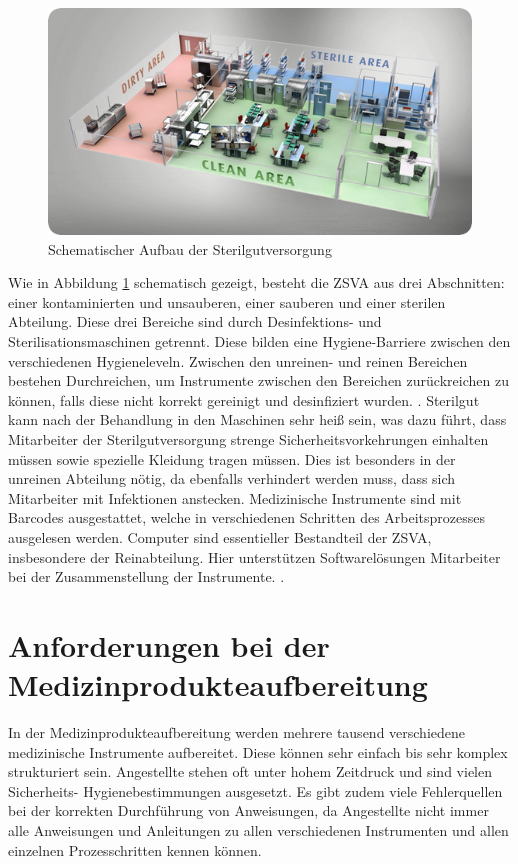 \begin{figure}[htbp]
    \centering
    \includegraphics[width=1\textwidth]{data/bilder/clean-area-sterile-area.png}
    \caption{Schematischer Aufbau der Sterilgutversorgung \cite{Ives2017}}
    \label{fig:AufbauDerSterilgutversorgung}
\end{figure}

Wie in Abbildung \ref{fig:AufbauDerSterilgutversorgung} schematisch gezeigt, besteht die ZSVA aus drei Abschnitten: einer kontaminierten und unsauberen, einer sauberen und einer sterilen Abteilung. Diese drei Bereiche sind durch Desinfektions- und Sterilisationsmaschinen getrennt. Diese bilden eine Hygiene-Barriere zwischen den verschiedenen Hygieneleveln. Zwischen den unreinen- und reinen Bereichen bestehen Durchreichen, um Instrumente zwischen den Bereichen zurückreichen zu können, falls diese nicht korrekt gereinigt und desinfiziert wurden. \cite[S.~24]{Ruther2014}. Sterilgut kann nach der Behandlung in den Maschinen sehr heiß sein, was dazu führt, dass Mitarbeiter der Sterilgutversorgung strenge Sicherheitsvorkehrungen einhalten müssen sowie spezielle Kleidung tragen müssen. Dies ist besonders in der unreinen Abteilung nötig, da ebenfalls verhindert werden muss, dass sich Mitarbeiter mit Infektionen anstecken. Medizinische Instrumente sind mit Barcodes ausgestattet, welche in verschiedenen Schritten des Arbeitsprozesses ausgelesen werden. Computer sind essentieller Bestandteil der ZSVA, insbesondere der Reinabteilung. Hier unterstützen Softwarelösungen Mitarbeiter bei der Zusammenstellung der Instrumente. \cite[S.~25]{Ruther2014}.
%
%
\section{Anforderungen bei der Medizinprodukteaufbereitung}
In der Medizinprodukteaufbereitung werden mehrere tausend verschiedene medizinische Instrumente aufbereitet. Diese können sehr einfach bis sehr komplex strukturiert sein. Angestellte stehen oft unter hohem Zeitdruck und sind vielen Sicherheits- Hygienebestimmungen ausgesetzt. Es gibt zudem viele Fehlerquellen bei der korrekten Durchführung von Anweisungen, da Angestellte nicht immer alle Anweisungen und Anleitungen zu allen verschiedenen Instrumenten und allen einzelnen Prozesschritten kennen können.

